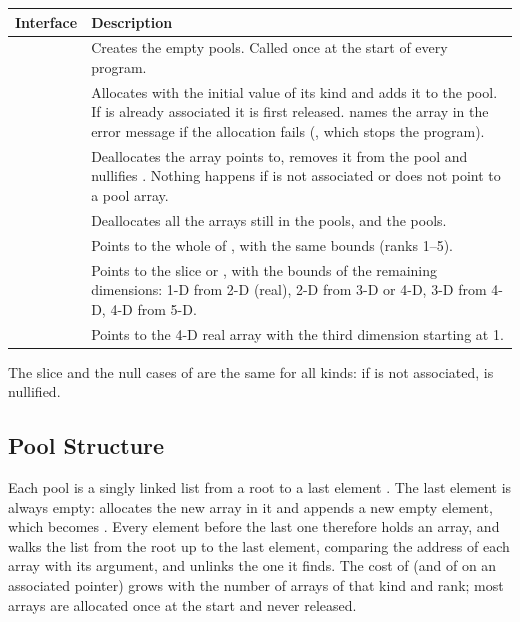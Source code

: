 \begin{longtable}{L{4.6cm} L{9.4cm}}
  \toprule
  \textbf{Interface} & \textbf{Description} \\
  \midrule
  \endhead
  \bottomrule
  \endfoot
   &
    Creates the empty pools. Called once at the start of every program. \\
   &
    Allocates  with the initial value of its kind
    and adds it to the pool. If  is already associated it is first
    released.  names the array in the error message if the
    allocation fails (, which stops the program). \\
   &
    Deallocates the array  points to, removes it from the pool and
    nullifies . Nothing happens if  is not associated or
    does not point to a pool array. \\
   &
    Deallocates all the arrays still in the pools, and the pools. \\
   &
    Points  to the whole of , with the same bounds (ranks
    1--5). \\
   &
    Points  to the slice  or
    , with the bounds of the remaining dimensions:
    1-D from 2-D (real), 2-D from 3-D or 4-D, 3-D from 4-D, 4-D from
    5-D. \\
   &
    Points  to the 4-D real array  with the third
    dimension starting at 1. \\
\end{longtable}

\noindent The slice and the null cases of  are the same for
all kinds: if  is not associated,  is nullified.

\subsection{Pool Structure}

Each pool is a singly linked list from a root  to a last element
. The last element is always empty:  allocates the new
array in it and appends a new empty element, which becomes . Every
element before the last one therefore holds an array, and 
walks the list from the root up to the last element, comparing the address
of each array with its argument, and unlinks the one it finds. The cost of
 (and of  on an associated pointer) grows with the
number of arrays of that kind and rank; most arrays are allocated once at
the start and never released.

